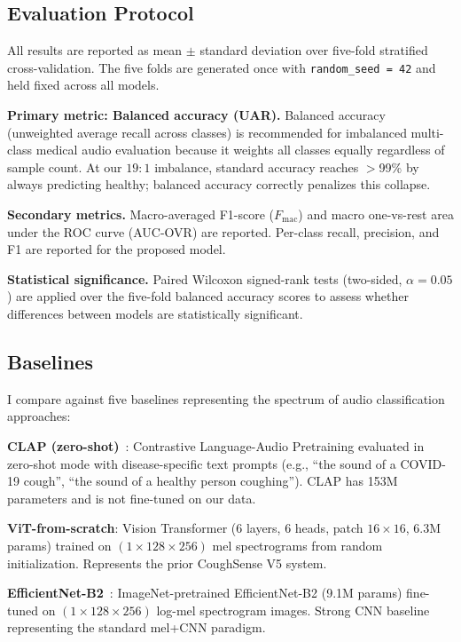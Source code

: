 \documentclass[10pt,journal,compsoc]{IEEEtran}
\begin{document}
\subsection{Evaluation Protocol}

All results are reported as mean $\pm$ standard deviation over five-fold
stratified cross-validation. The five folds are generated once with
\texttt{random\_seed = 42} and held fixed across all models.

\textbf{Primary metric: Balanced accuracy (UAR).}
Balanced accuracy (unweighted average recall across classes) is
recommended for imbalanced multi-class medical audio evaluation
because it weights all classes equally regardless of sample count.
At our $19\!:\!1$ imbalance, standard accuracy reaches $>$99\%
by always predicting healthy; balanced accuracy correctly penalizes
this collapse.

\textbf{Secondary metrics.}
Macro-averaged F1-score ($F_{\mathrm{mac}}$) and macro one-vs-rest
area under the ROC curve (AUC-OVR) are reported.
Per-class recall, precision, and F1 are reported for the proposed model.

\textbf{Statistical significance.}
Paired Wilcoxon signed-rank tests (two-sided, $\alpha = 0.05$) are
applied over the five-fold balanced accuracy scores to assess
whether differences between models are statistically significant.

\subsection{Baselines}

I compare against five baselines representing the spectrum of
audio classification approaches:

\textbf{CLAP (zero-shot)}~\cite{clap}: Contrastive Language-Audio
Pretraining evaluated in zero-shot mode with disease-specific text
prompts (e.g., ``the sound of a COVID-19 cough'',
``the sound of a healthy person coughing''). CLAP has 153M parameters
and is not fine-tuned on our data.

\textbf{ViT-from-scratch}: Vision Transformer (6 layers, 6 heads,
patch $16\times16$, 6.3M params) trained on $(1 \times 128 \times 256)$
mel spectrograms from random initialization. Represents the prior
CoughSense V5 system.

\textbf{EfficientNet-B2}~\cite{efficientnet}: ImageNet-pretrained
EfficientNet-B2 (9.1M params) fine-tuned on
$(1 \times 128 \times 256)$ log-mel spectrogram images.
Strong CNN baseline representing the standard mel+CNN paradigm.
\end{document}
